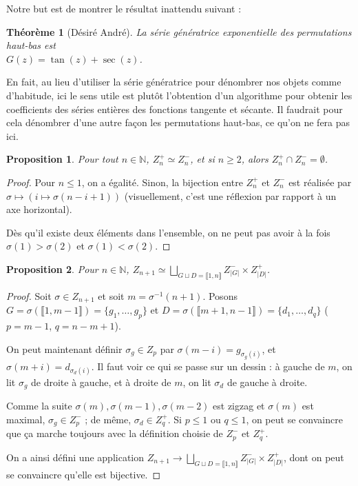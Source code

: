 \documentclass[a4paper, 11pt]{article}
\def\N{\mathbb{N}}
\newtheorem*{proposition}{Proposition}
\newtheorem*{theorem}{Théorème}
\begin{document}
Notre but est de montrer le résultat inattendu suivant :

\begin{theorem}[Désiré André]
  La série génératrice exponentielle des permutations haut-bas est\\
  $G(z) = \tan(z)+\sec(z)$.
\end{theorem}

En fait, au lieu d'utiliser la série génératrice pour dénombrer nos objets comme
d'habitude, ici le sens utile est plutôt l'obtention d'un algorithme pour
obtenir les coefficients des séries entières des fonctions tangente et sécante.
Il faudrait pour cela dénombrer d'une autre façon les permutations haut-bas, ce
qu'on ne fera pas ici.

\begin{proposition}
  Pour tout $n \in \N$, $Z_n^+ \simeq Z_n^-$, et si $n \geq 2$, alors $Z_n^+
  \cap Z_n^- = \emptyset$.
\end{proposition}
\begin{proof}
  Pour $n \leq 1$, on a égalité. Sinon, la bijection entre $Z_n^+$ et $Z_n^-$
  est réalisée par $\sigma \mapsto (i \mapsto \sigma(n-i+1))$ (visuellement,
  c'est une réflexion par rapport à un axe horizontal).
  
  Dès qu'il existe deux éléments dans l'ensemble, on ne peut pas avoir à la fois
  $\sigma(1) > \sigma(2)$ et $\sigma(1) < \sigma(2)$.
\end{proof}

\begin{proposition}
  Pour $n \in \N$, $\displaystyle Z_{n+1} \simeq \bigsqcup_{G \sqcup D =
    \llbracket 1,n \rrbracket} Z_{|G|}^- \times Z_{|D|}^+$.
\end{proposition}
\begin{proof}
  Soit $\sigma \in Z_{n+1}$ et soit $m = \sigma^{-1}(n+1)$. Posons $G =
  \sigma(\llbracket 1,m-1 \rrbracket) = \{g_1, \ldots, g_p\}$ et $D =
  \sigma(\llbracket m+1,n-1 \rrbracket) = \{d_1, \ldots, d_q\}$ ($p = m-1$, $q =
  n-m+1$).

  On peut maintenant définir $\sigma_g \in Z_p$ par $\sigma(m-i) =
  g_{\sigma_g(i)}$, et $\sigma(m+i) = d_{\sigma_d(i)}$. Il faut voir ce qui se
  passe sur un dessin : à gauche de $m$, on lit $\sigma_g$ de droite à gauche,
  et à droite de $m$, on lit $\sigma_d$ de gauche à droite.

  Comme la suite $\sigma(m), \sigma(m-1), \sigma(m-2)$ est zigzag et $\sigma(m)$
  est maximal, $\sigma_g \in Z_p^-$ ; de même, $\sigma_d \in Z_q^+$. Si $p \leq
  1$ ou $q \leq 1$, on peut se convaincre que ça marche toujours avec la
  définition choisie de $Z_p^-$ et $Z_q^+$.

  On a ainsi défini une application $Z_{n+1} \longrightarrow \bigsqcup_{G \sqcup
    D = \llbracket 1,n \rrbracket} Z_{|G|}^- \times Z_{|D|}^+$, dont on peut se
  convaincre qu'elle est bijective.
\end{proof}
\end{document}
